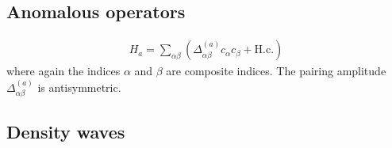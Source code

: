 \documentclass[letterpaper,10pt,english]{sphinxmanual}
\begin{document}
\subsection{Anomalous operators}
\label{\detokenize{models:anomalous-operators}}\begin{equation*}
\begin{split}H_a = \sum_{\alpha\beta} \left(\Delta^{(a)}_{\alpha\beta} c_\alpha c_\beta  + \mathrm{H.c.}\right)\end{split}
\end{equation*}
\sphinxAtStartPar
where again the indices \(\alpha\) and \(\beta\) are composite indices. The pairing amplitude \(\Delta^{(a)}_{\alpha\beta}\) is antisymmetric.


\subsection{Density waves}
\end{document}
